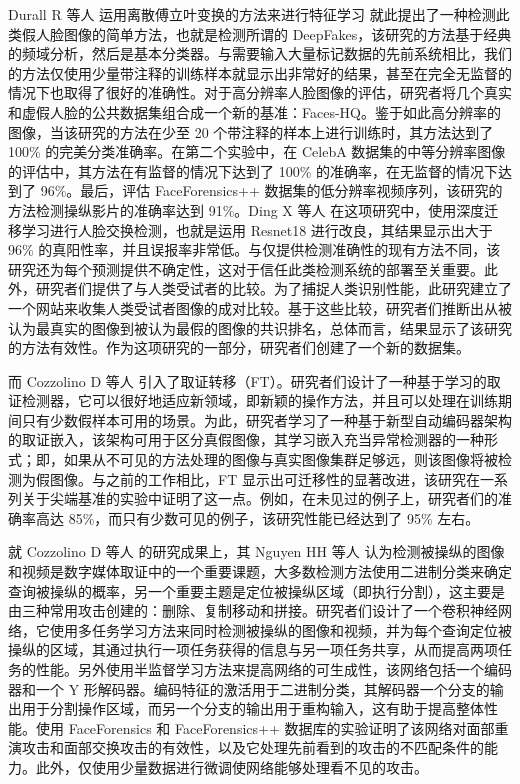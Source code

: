 Durall R 等人 \cite{durall2019unmasking} 运用离散傅立叶变换的方法来进行特征学习 就此提出了一种检测此类假人脸图像的简单方法，也就是检测所谓的 DeepFakes，该研究的方法基于经典的频域分析，然后是基本分类器。与需要输入大量标记数据的先前系统相比，我们的方法仅使用少量带注释的训练样本就显示出非常好的结果，甚至在完全无监督的情况下也取得了很好的准确性。对于高分辨率人脸图像的评估，研究者将几个真实和虚假人脸的公共数据集组合成一个新的基准：Faces-HQ。鉴于如此高分辨率的图像，当该研究的方法在少至 20 个带注释的样本上进行训练时，其方法达到了 100\% 的完美分类准确率。在第二个实验中，在 CelebA 数据集的中等分辨率图像的评估中，其方法在有监督的情况下达到了 100\% 的准确率，在无监督的情况下达到了 96\%。最后，评估 FaceForensics++ 数据集的低分辨率视频序列，该研究的方法检测操纵影片的准确率达到 91\%。Ding X 等人 \cite{ding2020swapped} 在这项研究中，使用深度迁移学习进行人脸交换检测，也就是运用 Resnet18 进行改良，其结果显示出大于 96\% 的真阳性率，并且误报率非常低。与仅提供检测准确性的现有方法不同，该研究还为每个预测提供不确定性，这对于信任此类检测系统的部署至关重要。此外，研究者们提供了与人类受试者的比较。为了捕捉人类识别性能，此研究建立了一个网站来收集人类受试者图像的成对比较。基于这些比较，研究者们推断出从被认为最真实的图像到被认为最假的图像的共识排名，总体而言，结果显示了该研究的方法有效性。作为这项研究的一部分，研究者们创建了一个新的数据集。

而 Cozzolino D 等人 \cite{cozzolino2018forensictransfer} 引入了取证转移（FT）。研究者们设计了一种基于学习的取证检测器，它可以很好地适应新领域，即新颖的操作方法，并且可以处理在训练期间只有少数假样本可用的场景。为此，研究者学习了一种基于新型自动编码器架构的取证嵌入，该架构可用于区分真假图像，其学习嵌入充当异常检测器的一种形式；即，如果从不可见的方法处理的图像与真实图像集群足够远，则该图像将被检测为假图像。与之前的工作相比，FT 显示出可迁移性的显著改进，该研究在一系列关于尖端基准的实验中证明了这一点。例如，在未见过的例子上，研究者们的准确率高达 85\%，而只有少数可见的例子，该研究性能已经达到了 95\% 左右。

就 Cozzolino D 等人 \cite{cozzolino2018forensictransfer} 的研究成果上，其 Nguyen HH 等人 \cite{nguyen2019multi} 认为检测被操纵的图像和视频是数字媒体取证中的一个重要课题，大多数检测方法使用二进制分类来确定查询被操纵的概率，另一个重要主题是定位被操纵区域（即执行分割），这主要是由三种常用攻击创建的：删除、复制移动和拼接。研究者们设计了一个卷积神经网络，它使用多任务学习方法来同时检测被操纵的图像和视频，并为每个查询定位被操纵的区域，其通过执行一项任务获得的信息与另一项任务共享，从而提高两项任务的性能。另外使用半监督学习方法来提高网络的可生成性，该网络包括一个编码器和一个 Y 形解码器。编码特征的激活用于二进制分类，其解码器一个分支的输出用于分割操作区域，而另一个分支的输出用于重构输入，这有助于提高整体性能。使用 FaceForensics 和 FaceForensics++ 数据库的实验证明了该网络对面部重演攻击和面部交换攻击的有效性，以及它处理先前看到的攻击的不匹配条件的能力。此外，仅使用少量数据进行微调使网络能够处理看不见的攻击。

